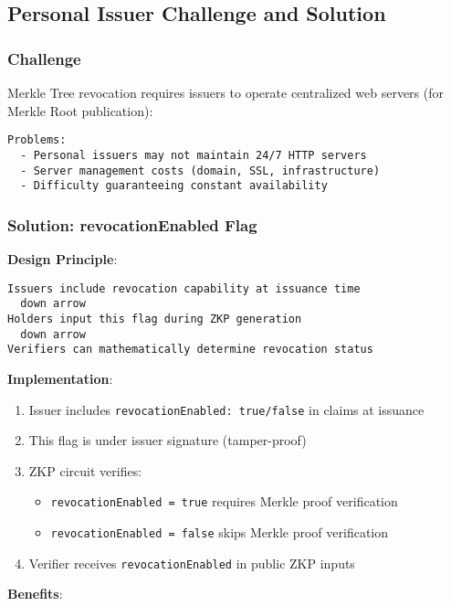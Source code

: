 \subsection{Personal Issuer Challenge and Solution}

\subsubsection{Challenge}

Merkle Tree revocation requires issuers to operate centralized web servers (for Merkle Root publication):

\begin{verbatim}
Problems:
  - Personal issuers may not maintain 24/7 HTTP servers
  - Server management costs (domain, SSL, infrastructure)
  - Difficulty guaranteeing constant availability
\end{verbatim}

\subsubsection{Solution: revocationEnabled Flag}

\textbf{Design Principle}:

\begin{verbatim}
Issuers include revocation capability at issuance time
  down arrow
Holders input this flag during ZKP generation
  down arrow
Verifiers can mathematically determine revocation status
\end{verbatim}

\textbf{Implementation}:

\begin{enumerate}
  \item Issuer includes \texttt{revocationEnabled: true/false} in claims at issuance
  \item This flag is under issuer signature (tamper-proof)
  \item ZKP circuit verifies:
    \begin{itemize}
      \item \texttt{revocationEnabled = true} requires Merkle proof verification
      \item \texttt{revocationEnabled = false} skips Merkle proof verification
    \end{itemize}
  \item Verifier receives \texttt{revocationEnabled} in public ZKP inputs
\end{enumerate}

\textbf{Benefits}:

